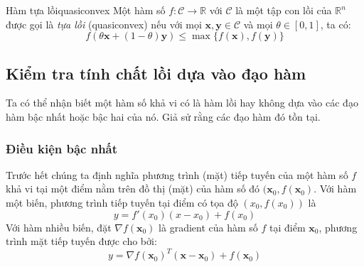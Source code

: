 \begin{mydef}{Hàm tựa lồi}{quasiconvex}
Một hàm số $f: \mathcal{C} \rightarrow \mathbb{R}$ với $\mathcal{C}$ là một tập con {lồi} của $\mathbb{R}^n$ được gọi là \textit{tựa lồi} (quasiconvex) nếu với mọi $\mathbf{x}, \mathbf{y} \in \mathcal{C}$ và mọi $\theta \in [0, 1]$, ta có:  
\begin{equation*} 
f(\theta\mathbf{x} + (1 - \theta)\mathbf{y}) \leq \max\{f(\mathbf{x}), f(\mathbf{y})\} 
\end{equation*} 
\end{mydef}

 
 
\subsection{Kiểm tra tính chất lồi dựa vào đạo hàm}
Ta có thể nhận biết một hàm số khả vi có là hàm lồi hay không dựa vào các
đạo hàm bậc nhất hoặc bậc hai của nó. Giả sử rằng các
đạo hàm đó tồn tại. 

\subsubsection{Điều kiện bậc nhất}

Trước hết chúng ta định nghĩa phương trình (mặt) tiếp tuyến của một hàm số
$f$ khả vi tại một điểm nằm trên đồ thị (mặt) của hàm số đó $(\mathbf{x}_0,
f(\mathbf{x}_0)$. Với hàm một biến, phương trình tiếp tuyến tại điểm có tọa độ
$(x_0, f(x_0))$ là 
\begin{equation*} 
y = f'(x_0)(x - x_0) + f(x_0) 
\end{equation*} 
Với hàm nhiều biến, đặt $\nabla f(\mathbf{x}_0)$ là gradient của hàm số $f$ tại điểm $\mathbf{x}_0$, phương trình mặt tiếp tuyến được cho bởi: 
\begin{equation*} 
y = \nabla f(\mathbf{x}_0)^T (\mathbf{x} - \mathbf{x}_0) + f(\mathbf{x}_0) 
\end{equation*} 

    

 
